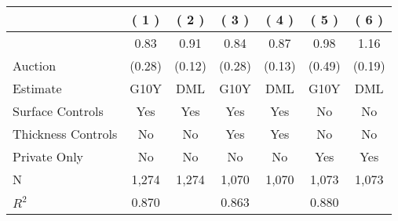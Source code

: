 
\begin{tabular}{lcccccc}
\toprule
 & ( 1 ) & ( 2 ) & ( 3 ) & ( 4 ) & ( 5 ) & ( 6 )\\
\midrule
 & 0.83 & 0.91 & 0.84 & 0.87 & 0.98 & 1.16\\

\multirow{-2}{*}{\raggedright\arraybackslash Auction} & (0.28) & (0.12) & (0.28) & (0.13) & (0.49) & (0.19)\\

\midrule
Estimate & G10Y & DML & G10Y & DML & G10Y & DML\\

Surface Controls & Yes & Yes & Yes & Yes & No & No\\

Thickness Controls & No & No & Yes & Yes & No & No\\

Private Only & No & No & No & No & Yes & Yes\\

N & 1,274 & 1,274 & 1,070 & 1,070 & 1,073 & 1,073\\

$R^2$ & 0.870 &  & 0.863 &  & 0.880 & \\
\bottomrule
\end{tabular}
